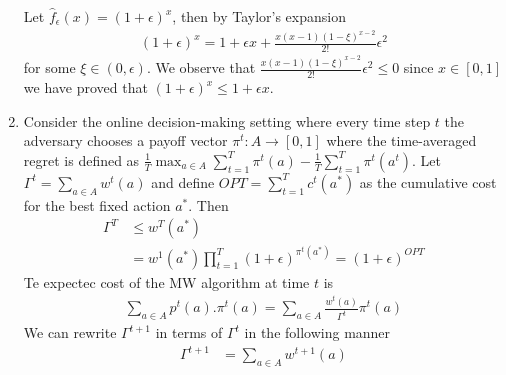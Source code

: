 \documentclass[a4paper,12pt]{article}
\theoremstyle{definition}
\begin{document}
\begin{enumerate}
Let $\hat{f}_\epsilon(x)=(1+\epsilon)^x$, then by Taylor's expansion  %
\begin{align*}
(1+\epsilon)^x = 1 + \epsilon x + \frac{x(x-1)(1-\xi)^{x-2}}{2!}\epsilon^2
\end{align*}
for some $\xi \in (0,\epsilon)$. We observe that $\frac{x(x-1)(1-\xi)^{x-2}}{2!}\epsilon^2 \leq 0$ since $x \in [0,1]$ we have proved that $(1+\epsilon)^x \leq 1+\epsilon x$.
\item Consider the online decision-making setting where every time step $t$ the adversary  chooses a payoff vector $\pi^t:A \to [0,1]$ where the time-averaged regret is defined as $\frac{1}{T} \max_{a\in A}\sum_{t=1}^{T}\pi^t(a)-\frac{1}{T}\sum_{t=1}^{T}\pi^t(a^t)$. Let $\Gamma^t =\sum_{a\in A}w^t(a)$ and define $OPT = \sum_{t=1}^{T}c^t(a^\ast)$ as the cumulative cost for the best fixed action $a^\ast$. Then
\begin{align*}
\Gamma^T&\leq w^T(a^\ast)\\
&=w^1(a^\ast)\prod_{t=1}^{T}(1+\epsilon)^{\pi^t(a^\ast)} = (1+\epsilon)^{OPT}
\end{align*}
Te expectec cost of the MW algorithm at time $t$ is 
\begin{align*}
\sum_{a \in A}p^t(a).\pi^t(a) = \sum_{a \in A}\frac{w^t(a)}{\Gamma^t}\pi^t(a) 
\end{align*}
We can rewrite $\Gamma^{t+1}$ in terms of $\Gamma^t$ in the following manner
\begin{align*}
\Gamma^{t+1} &= \sum_{a \in A}w^{t+1}(a)\\

\end{align*}
\end{enumerate}
\end{document}
